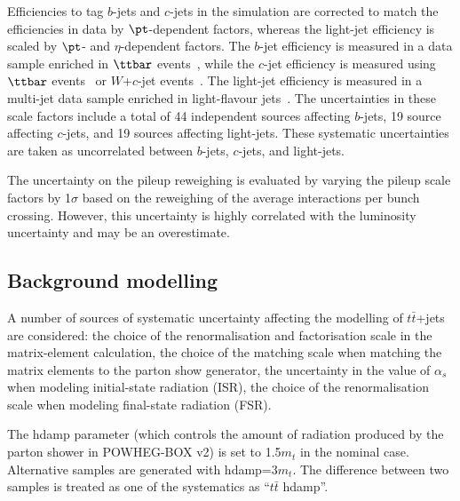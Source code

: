\documentclass[PAPER, coverpage, atlasdraft=true, texlive=2016, UKenglish]{\ATLASLATEXPATH atlasdoc}
\begin{document}
Efficiencies to tag $b$-jets and $c$-jets in the simulation are corrected to match the efficiencies in data by $\pt$-dependent factors,
whereas the light-jet efficiency is scaled by $\pt$- and $\eta$-dependent factors.
The $b$-jet efficiency is measured in a data sample enriched in $\ttbar$ events~\cite{Aad:2019epj79}, %
  while the $c$-jet efficiency is measured
using $\ttbar$ events~\cite{ATLAS-CONF-2018-001} or $W$+$c$-jet events~\cite{Aad:2015ydr}. 
The light-jet efficiency is measured in a multi-jet data sample enriched in light-flavour jets~\cite{ATLAS-CONF-2018-006}.
The uncertainties in these scale factors include a total of 44 independent sources affecting $b$-jets, 19 source affecting $c$-jets, and 19 sources affecting light-jets. 
These systematic uncertainties are taken as uncorrelated between $b$-jets, $c$-jets, and light-jets.

The uncertainty on the pileup reweighing is evaluated by varying the pileup scale factors
by 1$\sigma$ based on the reweighing of the average interactions per bunch crossing. However, this
uncertainty is highly correlated with the luminosity uncertainty and may be an overestimate.

\subsection{Background modelling}
\label{sec:syst_bkgmodeling}

A number of sources of systematic uncertainty affecting the modelling of $t\bar{t}$+jets are considered: the choice of the renormalisation and factorisation scale in the matrix-element calculation, the choice of the matching scale when matching the matrix elements to the parton show generator, the uncertainty in the value of $\alpha_s$ when modeling initial-state radiation (ISR), the choice of the renormalisation scale when modeling final-state radiation (FSR).

The hdamp parameter (which controls the amount of radiation produced by the parton shower in
POWHEG-BOX v2) is set to 1.5$m_t$ in the nominal case. Alternative samples are generated with hdamp=3$m_t$. The
difference between two samples is treated as one of the systematics as ``$t\bar{t}$ hdamp''. 
\end{document}
